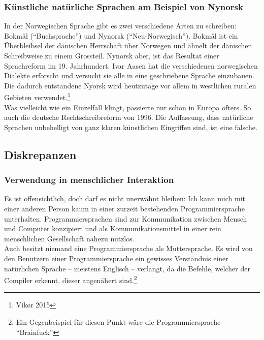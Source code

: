 \documentclass[10pt,a4paper]{article}
\begin{document}
\subsubsection{Künstliche natürliche Sprachen am Beispiel von Nynorsk}
In der Norwegischen Sprache gibt es zwei verschiedene Arten zu schreiben: Bokmål (\enquote{Buchsprache}) und Nynorsk (\enquote{Neu-Norwegisch}). Bokmål ist ein Überbleibsel der dänischen Herrschaft über Norwegen und ähnelt der dänischen Schreibweise zu einem Grossteil. Nynorsk aber, ist das Resultat einer Sprachreform im 19. Jahrhundert. Ivar Aasen hat die verschiedenen norwegischen Dialekte erforscht und versucht sie alle in eine geschriebene Sprache einzubauen. Die dadurch entstandene Nyorsk wird heutzutage vor allem in westlichen ruralen Gebieten verwendet.\footnote{Vikør 2015} \\
Was vielleicht wie ein Einzelfall klingt, passierte nur schon in Europa öfters. So auch die deutsche Rechtschreibreform von 1996. Die Auffassung, dass natürliche Sprachen unbehelligt von ganz klaren künstlichen Eingriffen sind, ist eine falsche.


\subsection{Diskrepanzen}
\subsubsection{Verwendung in menschlicher Interaktion}
Es ist offensichtlich, doch darf es nicht unerwähnt bleiben: Ich kann mich mit einer anderen Person kaum in einer zurzeit bestehenden Programmiersprache unterhalten. Programmiersprachen sind zur Kommunikation zwischen Mensch und Computer konzipiert und als Kommunikationsmittel in einer rein menschlichen Gesellschaft nahezu nutzlos. \\
Auch besitzt niemand eine Programmiersprache als Muttersprache. Es wird von den Benutzern einer Programmiersprache ein gewisses Verständnis einer natürlichen Sprache -- meistens Englisch --  verlangt, da die Befehle, welcher der Compiler erkennt, dieser angenähert sind.\footnote{Ein Gegenbeispiel für diesen Punkt wäre die Programmiersprache \enquote{Brainfuck}} 
\end{document}
